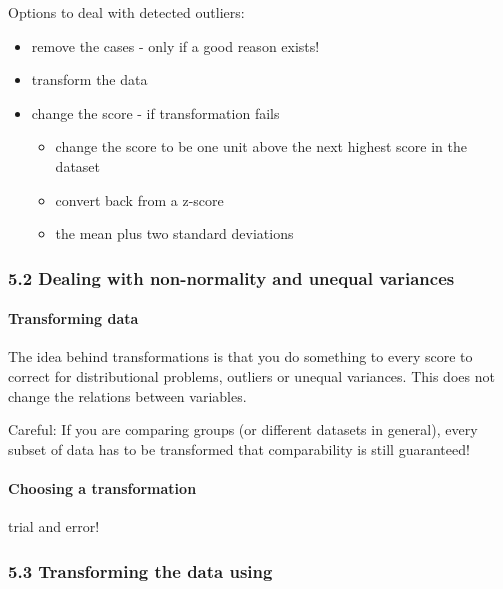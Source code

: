 \documentclass[
]{article}
\begin{document}
Options to deal with detected outliers:

\begin{itemize}
\item
  remove the cases - only if a good reason exists!
\item
  transform the data
\item
  change the score - if transformation fails

  \begin{itemize}
  \item
    change the score to be one unit above the next highest score in the
    dataset
  \item
    convert back from a z-score
  \item
    the mean plus two standard deviations
  \end{itemize}
\end{itemize}

\hypertarget{dealing-with-non-normality-and-unequal-variances}{%
\subsubsection{5.2 Dealing with non-normality and unequal
variances}\label{dealing-with-non-normality-and-unequal-variances}}

\hypertarget{transforming-data}{%
\paragraph{Transforming data}\label{transforming-data}}

The idea behind transformations is that you do something to every score
to correct for distributional problems, outliers or unequal variances.
This does not change the relations between variables.

Careful: If you are comparing groups (or different datasets in general),
every subset of data has to be transformed that comparability is still
guaranteed!

\hypertarget{choosing-a-transformation}{%
\paragraph{Choosing a transformation}\label{choosing-a-transformation}}

trial and error!

\hypertarget{transforming-the-data-using}{%
\subsubsection{5.3 Transforming the data
using}\label{transforming-the-data-using}}
\end{document}
